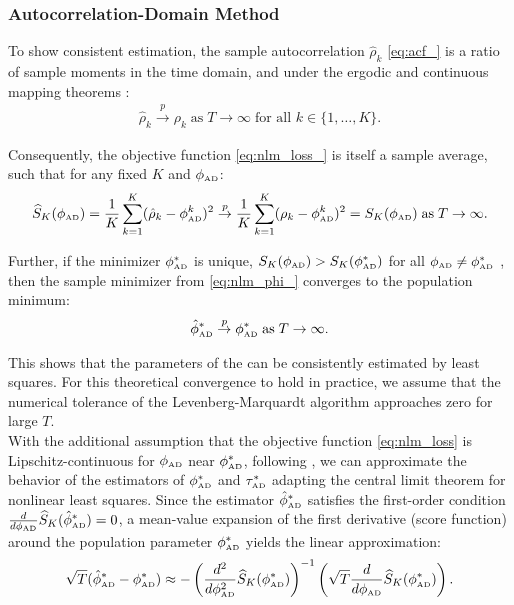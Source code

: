 \documentclass[docs/main.tex]{subfiles}
\begin{document}
\subsubsection{Autocorrelation-Domain Method}

To show consistent estimation, the sample autocorrelation $\hat\rho_k$ \eqref{eq:acf_} is a ratio of sample moments in the time domain, and under the ergodic and continuous mapping theorems \citep[Theorem~14.9]{hansen_econometrics_2022}:
\begin{align}
    \hat\rho_k \overset{p}{\to} \rho_k \;\text{as}\;T\to\infty\;\text{for all }k\in\{1, \dots, K\}.
\end{align}

\noindent Consequently, the objective function \eqref{eq:nlm_loss_} is itself a sample average, such that for any fixed $K$ and $\phi_{\scriptscriptstyle\text{AD}}$:
\begin{align}
    \widehat{S}_K(\phi_{\scriptscriptstyle\text{AD}}) = \frac{1}{K}\sum_{k=1}^K (\hat\rho_k - \phi_{\scriptscriptstyle\text{AD}}^k)^2 \overset{p}{\to} \frac{1}{K}\sum_{k=1}^K (\rho_k - \phi_{\scriptscriptstyle\text{AD}}^k)^2 = S_K(\phi_{\scriptscriptstyle\text{AD}}) \;\text{as}\;T\to\infty.
\end{align}

\noindent Further, if the minimizer $\phi_{\scriptscriptstyle\text{AD}}^*$ is unique, $S_K(\phi_{\scriptscriptstyle\text{AD}})>S_K(\phi_{\scriptscriptstyle\text{AD}}^*)$ for all $\phi_{\scriptscriptstyle\text{AD}}\ne\phi_{\scriptscriptstyle\text{AD}}^*$ \citep[Theorem~22.1]{hansen_econometrics_2022}, then the sample minimizer from \eqref{eq:nlm_phi_} converges to the population minimum:
\begin{align}
    \hat{\phi}^*_{\scriptscriptstyle\text{AD}} \overset{p}{\to} \phi_{\scriptscriptstyle\text{AD}}^* \;\text{as}\;T\to\infty.
\end{align}

\noindent This shows that the parameters of the  can be consistently estimated by least squares. For this theoretical convergence to hold in practice, we assume that the numerical tolerance of the Levenberg-Marquardt algorithm approaches zero for large $T$.\\

With the additional assumption that the objective function \eqref{eq:nlm_loss} is Lipschitz-continuous for $\phi_{\scriptscriptstyle\text{AD}}$ near $\phi_{\scriptscriptstyle\text{AD}}^*$, following \citet[Theorem~23.2]{hansen_econometrics_2022}, we can approximate the behavior of the estimators of $\phi_{\scriptscriptstyle\text{AD}}^*$ and $\tau_{\scriptscriptstyle\text{AD}}^*$ adapting the central limit theorem for nonlinear least squares. Since the estimator $\hat{\phi}^*_{\scriptscriptstyle\text{AD}}$ satisfies the first-order condition $\frac{d}{d\phi_{\scriptscriptstyle\text{AD}}}\widehat{S}_K(\hat{\phi}^*_{\scriptscriptstyle\text{AD}}) = 0$, a mean-value expansion of the first derivative (score function) around the population parameter $\phi_{\scriptscriptstyle\text{AD}}^*$ yields the linear approximation:
\begin{align}
    \sqrt{T} (\hat{\phi}^*_{\scriptscriptstyle\text{AD}} - \phi_{\scriptscriptstyle\text{AD}}^*) \approx -\left(\frac{d^2}{d\phi_{\scriptscriptstyle\text{AD}}^2} \widehat{S}_K(\phi_{\scriptscriptstyle\text{AD}}^*)\right)^{-1} \left( \sqrt{T}\frac{d}{d\phi_{\scriptscriptstyle\text{AD}}} \widehat{S}_K(\phi_{\scriptscriptstyle\text{AD}}^*)\right).
\end{align}
\end{document}
